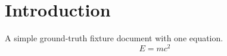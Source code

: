 \documentclass{article}
\begin{document}
\section{Introduction}
A simple ground-truth fixture document with one equation.
\begin{equation}
E = mc^2
\end{equation}
\end{document}
